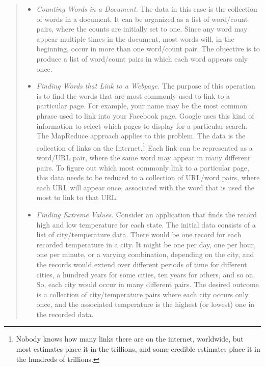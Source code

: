 \begin{quote}
\begin{itemize}
\item \emph{Counting Words in a Document.}  The data in this
case is the collection of words in a document.  It can be
organized as a list of word/count pairs, where the counts
are initially set to one.  Since any word may appear
multiple times in the document, most words will, in the beginning,
occur in more than one word/count pair.
The objective is to produce a list of word/count pairs
in which each word appears only once.
\item \emph{Finding Words that Link to a Webpage.}  The
purpose of this operation is to find the words that are
most commonly used to link to a particular page.  For example,
your name may be the most common phrase used to link into your
Facebook page.  Google uses this kind of information to select which
pages to display for a particular search.
The MapReduce approach applies to this problem.
The data is the
collection of links on the Internet.\footnote{Nobody knows how many
links there are on the internet, worldwide,
but most estimates place it in the trillions,
and some credible estimates place it in the hundreds of trillions. }
Each link can be represented as a word/URL pair,
where the same word may appear in many different pairs.
To figure out which most commonly link to a particular page,
this data needs to be reduced to a collection of
URL/word pairs, where each URL will appear once, associated
with the word that is used the most to link to that URL.
\item \emph{Finding Extreme Values.}  Consider
an application that finds the record high and low temperature
for each state.  The initial data consists of a list of
city/temperature data.  There would be one record for each
recorded temperature in a city. It might be one per day,
one per hour, one per minute, or a varying combination,
depending on the city, and the records would extend over
different periods of time for different cities,
a hundred years for some cities, ten years for others,
and so on. So, each city would occur in many different pairs.
The desired outcome is a collection of city/temperature
pairs where each city occurs only once, and the associated
temperature is the highest (or lowest) one in the recorded data.
\end{itemize}
\end{quote}

